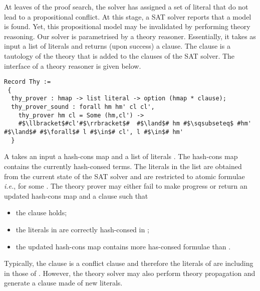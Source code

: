 \documentclass[utf8,a4paper,UKenglish,cleveref, autoref, thm-restate]{lipics-v2019}
\begin{document}
At leaves of the proof search, the solver has assigned a set of
literal that do not lead to a propositional conflict. At this stage, a
SAT solver reports that a model is found.
%
Yet, this propositional model may be invalidated by performing theory reasoning.
%
Our solver is parametrised by a theory reasoner. Essentially, it takes
as input a list of literals and returns (upon success) a clause. The
clause is a tautology of the theory that is added to the clauses of
the SAT solver.
%
The interface of a theory reasoner is given below.
\begin{verbatim}
Record Thy :=
 {
  thy_prover : hmap -> list literal -> option (hmap * clause);
  thy_prover_sound : forall hm hm' cl cl',
    thy_prover hm cl = Some (hm,cl') ->
    #$\llbracket$#cl'#$\rrbracket$#  #$\land$# hm #$\sqsubseteq$ #hm' #$\land$# #$\forall$# l #$\in$# cl', l #$\in$# hm'
  }
\end{verbatim}
A  takes an input a hash-cons map  and a
list of literals .  The hash-cons map  contains the
currently hash-consed terms. The literals in the list  are
obtained from the current state of the SAT solver and are restricted
to atomic formulae \emph{i.e.},  for some .
%
The theory prover may either fail to make progress or return an
updated hash-cons map  and a clause  such that
\begin{itemize}
\item the clause  holds;
\item the literals in  are correctly hash-consed in ;
\item the updated hash-cons map  contains more has-consed formulae than .
\end{itemize}
Typically, the clause  is a conflict clause and therefore
the literals of  are including in those of
. However, the theory solver may also perform theory
propagation and generate a clause made of new literals.
%
\end{document}
